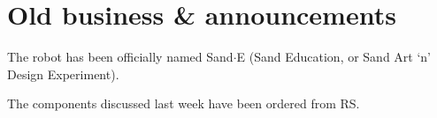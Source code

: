 \documentclass[a4paper,11pt,twoside,class=meetingmins,crop=false]{standalone}
\begin{document}

\maketitle

\section{Old business \& announcements}
\begin{items}
    \item \priormins
    \item The robot has been officially named Sand$\cdot$E (Sand Education, or Sand Art `n' Design Experiment).
    \item The components discussed last week have been ordered from RS.
\end{items}
\end{document}
